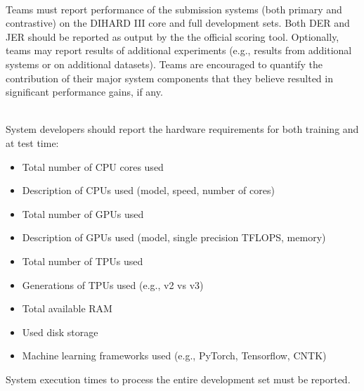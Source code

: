 \documentclass{article}
\begin{document}
\begin{appendices}
\vspace{0.5cm}
 \\
Teams must report performance of the submission systems (both primary and contrastive) on the DIHARD III core and full development sets. Both DER and JER should be reported as output by the the official scoring tool. Optionally, teams may report results of additional experiments (e.g., results from additional systems or on additional datasets). Teams are encouraged to quantify the contribution of their major system components that they believe resulted in significant performance gains, if any. 


\vspace{0.5cm}
 \\
System developers should report the hardware requirements for both training and at test time:
\begin{itemize}
    \item Total number of CPU cores used
    \item Description of CPUs used (model, speed, number of cores)
    \item Total number of GPUs used
    \item Description of GPUs used (model, single precision TFLOPS, memory)
    \item Total number of TPUs used
    \item Generations of TPUs used (e.g., v2 vs v3)
    \item Total available RAM
    \item Used disk storage
    \item Machine learning frameworks used (e.g., PyTorch, Tensorflow, CNTK)
\end{itemize}

System execution times to process the entire development set must be reported.



\end{appendices}
\end{document}
